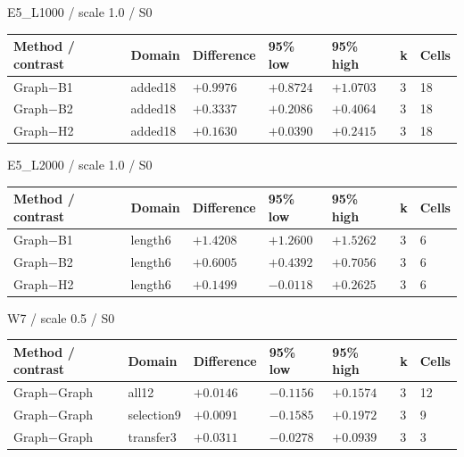 \par\noindent E5\_L1000 / scale 1.0 / S0
\par\nopagebreak[4]
\begin{tabular}{lllllll}
\hline
Method / contrast & Domain & Difference & 95\% low & 95\% high & k & Cells \\
\hline
Graph\ensuremath{-}B1 & added18 & $+0.9976$ & $+0.8724$ & $+1.0703$ & 3 & 18 \\
Graph\ensuremath{-}B2 & added18 & $+0.3337$ & $+0.2086$ & $+0.4064$ & 3 & 18 \\
Graph\ensuremath{-}H2 & added18 & $+0.1630$ & $+0.0390$ & $+0.2415$ & 3 & 18 \\
\hline
\end{tabular}


\par\noindent E5\_L2000 / scale 1.0 / S0
\par\nopagebreak[4]
\begin{tabular}{lllllll}
\hline
Method / contrast & Domain & Difference & 95\% low & 95\% high & k & Cells \\
\hline
Graph\ensuremath{-}B1 & length6 & $+1.4208$ & $+1.2600$ & $+1.5262$ & 3 & 6 \\
Graph\ensuremath{-}B2 & length6 & $+0.6005$ & $+0.4392$ & $+0.7056$ & 3 & 6 \\
Graph\ensuremath{-}H2 & length6 & $+0.1499$ & $-0.0118$ & $+0.2625$ & 3 & 6 \\
\hline
\end{tabular}


\par\noindent W7 / scale 0.5 / S0
\par\nopagebreak[4]
\begin{tabular}{lllllll}
\hline
Method / contrast & Domain & Difference & 95\% low & 95\% high & k & Cells \\
\hline
Graph\ensuremath{-}Graph & all12 & $+0.0146$ & $-0.1156$ & $+0.1574$ & 3 & 12 \\
Graph\ensuremath{-}Graph & selection9 & $+0.0091$ & $-0.1585$ & $+0.1972$ & 3 & 9 \\
Graph\ensuremath{-}Graph & transfer3 & $+0.0311$ & $-0.0278$ & $+0.0939$ & 3 & 3 \\
\hline
\end{tabular}


